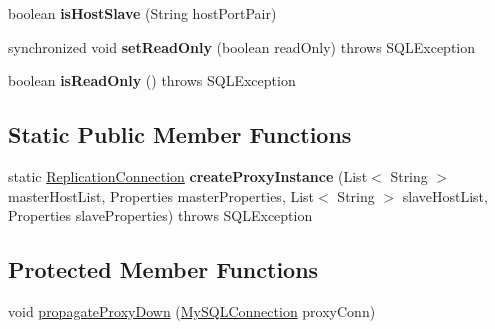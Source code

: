\begin{DoxyCompactItemize}
\item 
\mbox{\label{classcom_1_1mysql_1_1jdbc_1_1_replication_connection_proxy_ae0536c45c9b502ac2bf261582ef1e4b1}} 
boolean {\bfseries is\+Host\+Slave} (String host\+Port\+Pair)
\item 
\mbox{\label{classcom_1_1mysql_1_1jdbc_1_1_replication_connection_proxy_ab1eaa5cf0757b8d87a1d6d16d8c6cdea}} 
synchronized void {\bfseries set\+Read\+Only} (boolean read\+Only)  throws S\+Q\+L\+Exception 
\item 
\mbox{\label{classcom_1_1mysql_1_1jdbc_1_1_replication_connection_proxy_ae6b2d35f024720e606d26a19867650cb}} 
boolean {\bfseries is\+Read\+Only} ()  throws S\+Q\+L\+Exception 
\end{DoxyCompactItemize}
\subsection*{Static Public Member Functions}
\begin{DoxyCompactItemize}
\item 
\mbox{\label{classcom_1_1mysql_1_1jdbc_1_1_replication_connection_proxy_a718450466c78bfa46c790442afa425c5}} 
static \mbox{\hyperlink{interfacecom_1_1mysql_1_1jdbc_1_1_replication_connection}{Replication\+Connection}} {\bfseries create\+Proxy\+Instance} (List$<$ String $>$ master\+Host\+List, Properties master\+Properties, List$<$ String $>$ slave\+Host\+List, Properties slave\+Properties)  throws S\+Q\+L\+Exception 
\end{DoxyCompactItemize}
\subsection*{Protected Member Functions}
\begin{DoxyCompactItemize}
\item 
void \mbox{\hyperlink{classcom_1_1mysql_1_1jdbc_1_1_replication_connection_proxy_a87e8d96ac3318b83e27d47dcf813c500}{propagate\+Proxy\+Down}} (\mbox{\hyperlink{interfacecom_1_1mysql_1_1jdbc_1_1_my_s_q_l_connection}{My\+S\+Q\+L\+Connection}} proxy\+Conn)
\end{DoxyCompactItemize}
